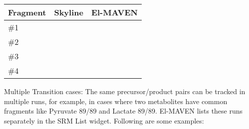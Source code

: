 \documentclass[letterpaper,10pt,english,openany,oneside]{sphinxmanual}
\begin{document}
\begin{savenotes}\sphinxattablestart
\centering
\begin{tabulary}{\linewidth}[t]{|T|T|T|}
\hline
\sphinxstyletheadfamily 
Fragment
&\sphinxstyletheadfamily 
Skyline
&\sphinxstyletheadfamily 
El-MAVEN
\\
\hline
\#1
&
&
\\
\hline
\#2
&
&
\\
\hline
\#3
&
&
\\
\hline
\#4
&
&
\\
\hline
\end{tabulary}
\par
\sphinxattableend\end{savenotes}

Multiple Transition cases: The same precursor/product pairs can be tracked in multiple runs, for example, in cases where two metabolites have common fragments like Pyruvate 89/89 and Lactate 89/89. El-MAVEN lists these runs separately in the SRM List widget. Following are some examples:
\end{document}
